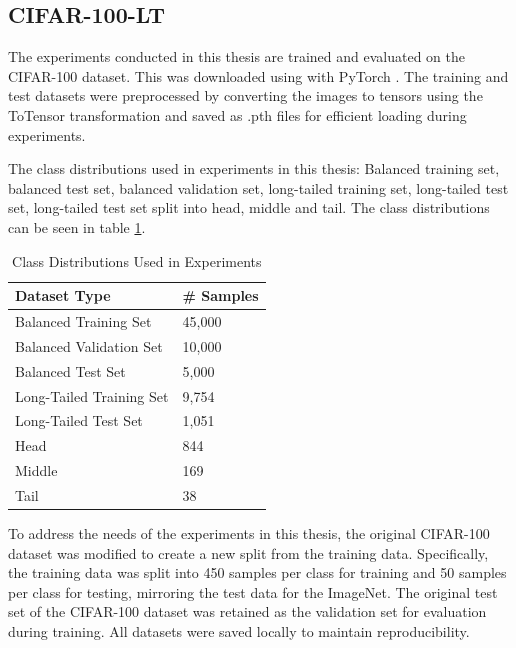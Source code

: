 \subsection{CIFAR-100-LT}
The experiments conducted in this thesis are trained and evaluated on the CIFAR-100 dataset. This was downloaded using with PyTorch \cite{pytorch_cifar100}. The training and test datasets were preprocessed by converting the images to tensors using the ToTensor transformation and saved as .pth files for efficient loading during experiments. 

The class distributions used in experiments in this thesis: Balanced training set, balanced test set, balanced validation set, long-tailed training set, long-tailed test set, long-tailed test set split into head, middle and tail. The class distributions can be seen in table \ref{tab:class_distributions}.

\begin{table}[h!]
    \centering
    \caption{Class Distributions Used in Experiments}
    \label{tab:class_distributions}
    \small
    \begin{tabular}{ll}
    \toprule
    \textbf{Dataset Type}                       & \textbf{\# Samples}                                                                 \\ \midrule
    Balanced Training Set                       & 45,000        \\ 
    Balanced Validation Set                     & 10,000    \\ 
    Balanced Test Set                           & 5,000    \\ \hline
    Long-Tailed Training Set                    & 9,754      \\ 
    Long-Tailed Test Set                        & 1,051 \\ \hline
    Head  & 844 \\ 
    Middle   & 169 \\ 
    Tail  & 38 \\
    \bottomrule
    \end{tabular}
    \end{table}
    

To address the needs of the experiments in this thesis, the original CIFAR-100 dataset was modified to create a new split from the training data. Specifically, the training data was split into 450 samples per class for training and 50 samples per class for testing, mirroring the test data for the ImageNet. The original test set of the CIFAR-100 dataset was retained as the validation set for evaluation during training. All datasets were saved locally to maintain reproducibility.

